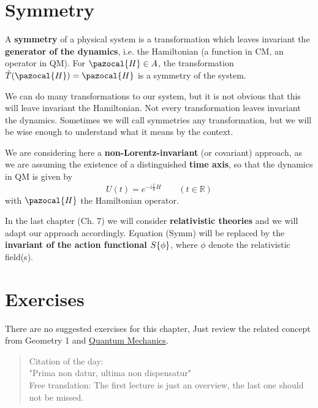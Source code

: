 \documentclass[../main.tex]{subfiles}
\begin{document}
\section{Symmetry}
\begin{kaobox}[frametitle=Terminology $\star$]
A \textbf{symmetry} of a physical system is a transformation which leaves invariant the \textbf{generator of the dynamics}, i.e. the Hamiltonian (a function in CM, an operator in QM). For $\pazocal{H}\in A$, the transformation $\Tilde{T}(\pazocal{H})=\pazocal{H}$ is a symmetry of the system.
\end{kaobox}
We can do many transformations to our system, but it is not obvious that this will leave invariant the Hamiltonian. Not every transformation leaves invariant the dynamics. Sometimes we will call symmetries any transformation, but we will be wise enough to understand what it means by the context.
\begin{kaobox}[frametitle=Remark]
We are considering here a \textbf{non-Lorentz-invariant} (or covariant) approach, as we are assuming the existence of a distinguished \textbf{time axis}, so that the dynamics in QM is given by
\[
U(t) = e^{-i\frac{t}{\hslash}H} \quad \quad \left(t\in\mathbb{R}\right)
\]
with $\pazocal{H}$ the Hamiltonian operator.
\end{kaobox}
In the last chapter (Ch. 7) we will consider \textbf{relativistic theories} and we will adapt our approach accordingly. Equation (Symm) will be replaced by the \textbf{invariant of the action functional $S\qty{\phi}$}, where $\phi$ denote the relativistic field(s).
\section{Exercises}
There are no suggested exercises for this chapter, Just review the related concept from Geometry 1 and \href{https://www.overleaf.com/read/hczjjtmcwsvj}{Quantum Mechanics}.
\newpage
\vspace*{\fill} 
\begin{quote} 
{\centering 
Citation of the day:\\
"Prima non datur, ultima non dispensatur"}\\
\newline
Free translation: The first lecture is just an overview, the last one should not be missed.
\end{quote}
\vspace*{\fill}
\end{document}
